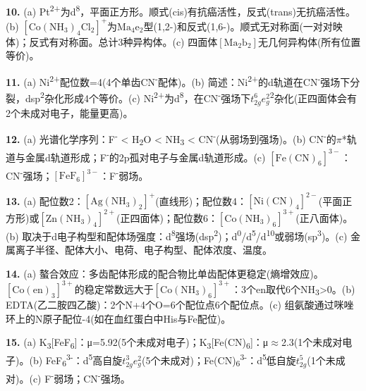 \documentclass[a4paper,11pt]{ctexart}
\newcommand{\箭}{\ensuremath{\rightarrow}}
\newcommand{\左箭}{\ensuremath{\leftarrow}}
\newcommand{\上箭}{\ensuremath{\uparrow}}
\newcommand{\下箭}{\ensuremath{\downarrow}}
\newcommand{\衡}{\ensuremath{\rightleftharpoons}}
\newcommand{\双箭}{\ensuremath{\leftrightarrow}}
\newcommand{\约等于}{\ensuremath{\approx}}
\newcommand{\小于等于}{\ensuremath{\leq}}
\newcommand{\大于等于}{\ensuremath{\geq}}
\newcommand{\不等于}{\ensuremath{\neq}}
\newcommand{\西格马}{\ensuremath{\sigma}}
\newcommand{\派}{\ensuremath{\pi}}
\begin{document}
\textbf{10.} (a) Pt\textsuperscript{2+}为d\textsuperscript{8}，平面正方形。顺式(cis)有抗癌活性，反式(trans)无抗癌活性。(b) \(\mathrm{[Co(NH_3)_4Cl_2]^+}\)为\(\mathrm{Ma_4e_2}\)型(1,2-)和反式(1,6-)。顺式无对称面(一对对映体)；反式有对称面。总计3种异构体。(c) 四面体\(\mathrm{[Ma_2b_2]}\)无几何异构体(所有位置等价)。

\textbf{11.} (a) Ni\textsuperscript{2+}配位数=4(4个单齿CN\textsuperscript{-}配体)。(b) 简述：Ni\textsuperscript{2+}的d轨道在CN\textsuperscript{-}强场下分裂，dsp\textsuperscript{2}杂化形成4个等价。(c) Ni\textsuperscript{2+}为d\textsuperscript{8}，在CN\textsuperscript{-}强场下\(t_{2g}^6 e_g^2\)\textsuperscript{2}杂化(正四面体会有2个未成对电子，能量更高)。

\textbf{12.} (a) 光谱化学序列：F\textsuperscript{-} \textless{} H\textsubscript{2}O \textless{} NH\textsubscript{3} \textless{} CN\textsuperscript{-}(从弱场到强场)。(b) CN\textsuperscript{-}的\派*轨道与金属d轨道形成；F\textsuperscript{-}的2p孤对电子与金属d轨道形成。(c) \(\mathrm{[Fe(CN)_6]^{3-}}\)：CN\textsuperscript{-}强场；\(\mathrm{[FeF_6]^{3-}}\)：F\textsuperscript{-}弱场。

\textbf{13.} (a) 配位数2：\(\mathrm{[Ag(NH_3)_2]^+}\)(直线形)；配位数4：\(\mathrm{[Ni(CN)_4]^{2-}}\)(平面正方形)或\(\mathrm{[Zn(NH_3)_4]^{2+}}\)(正四面体)；配位数6：\(\mathrm{[Co(NH_3)_6]^{3+}}\)(正八面体)。(b) 取决于d电子构型和配体场强度：d\textsuperscript{8}强场(dsp\textsuperscript{2})；d\textsuperscript{0}/d\textsuperscript{5}/d\textsuperscript{10}或弱场(sp\textsuperscript{3})。(c) 金属离子半径、配体大小、电荷、电子构型、配体浓度、温度。

\textbf{14.} (a) 螯合效应：多齿配体形成的配合物比单齿配体更稳定(熵增效应)。\(\mathrm{[Co(en)_3]^{3+}}\)的稳定常数远大于\(\mathrm{[Co(NH_3)_6]^{3+}}\)：3个en取代6个NH\textsubscript{3}\textgreater0。(b) EDTA(乙二胺四乙酸)：2个N+4个O=6个配位点6个配位点。(c) 组氨酸通过咪唑环上的N原子配位-4(如在血红蛋白中His与Fe配位)。

\textbf{15.} (a) K\textsubscript{3}{[}FeF\textsubscript{6}{]}：μ=5.92(5个未成对电子)；K\textsubscript{3}{[}Fe(CN)\textsubscript{6}{]}：μ\约等于2.3(1个未成对电子)。(b) FeF\textsubscript{6}\textsuperscript{3-}：d\textsuperscript{5}高自旋\(t_{2g}^3 e_g^2\)(5个未成对)；Fe(CN)\textsubscript{6}\textsuperscript{3-}：d\textsuperscript{5}低自旋\(t_{2g}^5\)(1个未成对)。(c) F\textsuperscript{-}弱场；CN\textsuperscript{-}强场。
\end{document}
